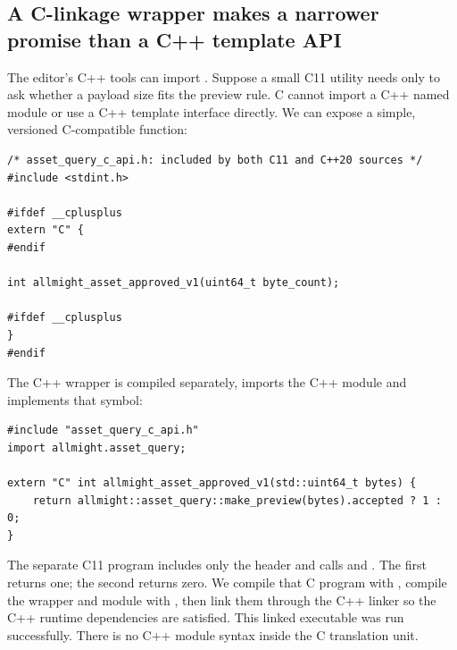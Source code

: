 \subsection{A C-linkage wrapper makes a narrower promise than a C++ template API}\label{01-foundations-i-ch006-a-c-linkage-wrapper-makes-a-narrower-promise-than-a-c-template-api}

\hypertarget{01-foundations-i-ch006-a-c-linkage-wrapper-makes-a-narrower-promise-than-a-c-template-api}{}

The editor's C++ tools can import . Suppose a small C11 utility needs only to ask whether a payload size fits the preview rule. C cannot import a C++ named module or use a C++ template interface directly. We can expose a simple, versioned C-compatible function:

\begin{verbatim}
/* asset_query_c_api.h: included by both C11 and C++20 sources */
#include <stdint.h>

#ifdef __cplusplus
extern "C" {
#endif

int allmight_asset_approved_v1(uint64_t byte_count);

#ifdef __cplusplus
}
#endif
\end{verbatim}

The C++ wrapper is compiled separately, imports the C++ module and implements that symbol:

\begin{verbatim}
#include "asset_query_c_api.h"
import allmight.asset_query;

extern "C" int allmight_asset_approved_v1(std::uint64_t bytes) {
    return allmight::asset_query::make_preview(bytes).accepted ? 1 : 0;
}
\end{verbatim}

The separate C11 program includes only the header and calls  and . The first returns one; the second returns zero. We compile that C program with , compile the wrapper and module with , then link them through the C++ linker so the C++ runtime dependencies are satisfied. This linked executable was run successfully. There is no C++ module syntax inside the C translation unit.

